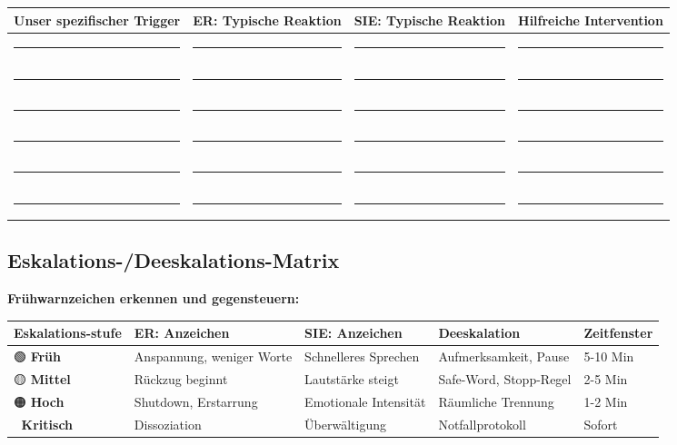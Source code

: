 {\begin{center}
\begin{tabular}{|p{3.5cm}|p{3cm}|p{3cm}|p{4.5cm}|}
\hline
\textbf{Unser spezifischer Trigger} & \textbf{ER: Typische Reaktion} & \textbf{SIE: Typische Reaktion} & \textbf{Hilfreiche Intervention} \\
\hline
\rule{3cm}{0.4pt} & \rule{2.5cm}{0.4pt} & \rule{2.5cm}{0.4pt} & \rule{4cm}{0.4pt} \\
\hline
\rule{3cm}{0.4pt} & \rule{2.5cm}{0.4pt} & \rule{2.5cm}{0.4pt} & \rule{4cm}{0.4pt} \\
\hline
\rule{3cm}{0.4pt} & \rule{2.5cm}{0.4pt} & \rule{2.5cm}{0.4pt} & \rule{4cm}{0.4pt} \\
\hline
\rule{3cm}{0.4pt} & \rule{2.5cm}{0.4pt} & \rule{2.5cm}{0.4pt} & \rule{4cm}{0.4pt} \\
\hline
\rule{3cm}{0.4pt} & \rule{2.5cm}{0.4pt} & \rule{2.5cm}{0.4pt} & \rule{4cm}{0.4pt} \\
\hline
\rule{3cm}{0.4pt} & \rule{2.5cm}{0.4pt} & \rule{2.5cm}{0.4pt} & \rule{4cm}{0.4pt} \\
\hline
\end{tabular}
\end{center}

\hypertarget{eskalations-deeskalations-matrix}{%
\subsection{Eskalations-/Deeskalations-Matrix}}\label{eskalations-deeskalations-matrix}

\textbf{Frühwarnzeichen erkennen und gegensteuern:}

\begin{center}
\begin{tabular}{|p{2.5cm}|p{3cm}|p{3cm}|p{3cm}|p{2.5cm}|}
\hline
\textbf{Eskalations-stufe} & \textbf{ER: Anzeichen} & \textbf{SIE: Anzeichen} & \textbf{Deeskalation} & \textbf{Zeitfenster} \\
\hline
🟢 \textbf{Früh} & Anspannung, weniger Worte & Schnelleres Sprechen & Aufmerksamkeit, Pause & 5-10 Min \\
\hline
🟡 \textbf{Mittel} & Rückzug beginnt & Lautstärke steigt & Safe-Word, Stopp-Regel & 2-5 Min \\
\hline
🟠 \textbf{Hoch} & Shutdown, Erstarrung & Emotionale Intensität & Räumliche Trennung & 1-2 Min \\
\hline
🔴 \textbf{Kritisch} & Dissoziation & Überwältigung & Notfallprotokoll & Sofort \\
\hline
\end{tabular}
\end{center}

}
